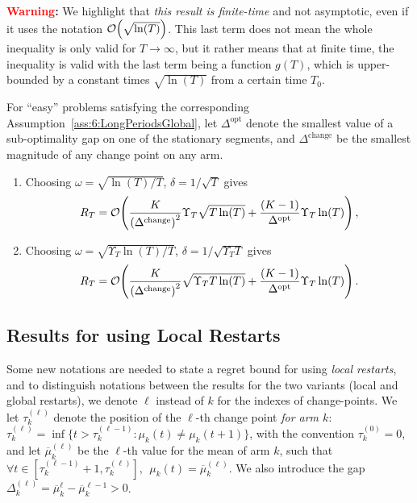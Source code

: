 \textbf{\textcolor{red}{Warning}:}
%
We highlight that \emph{this result is finite-time} and not asymptotic, even if it uses the notation $\mathop{}\mathopen{}\mathcal{O}\mathopen{}\left(\sqrt{\ln(T)}\right)$.
This last term does not mean the whole inequality is only valid for $T\to\infty$, but it rather means that at finite time, the inequality is valid with the last term being a function $g(T)$, which is upper-bounded by a constant times $\sqrt{\ln(T)}$ from a certain time $T_0$.

\begin{corollary}\label{cor:6:Global}
\begin{leftbar}[corollarybar]  %
    For ``easy'' problems satisfying the corresponding Assumption~\ref{ass:6:LongPeriodsGlobal},
    let $\Delta^{\text{opt}}$ denote the smallest value of a sub-optimality gap on one of the stationary segments, and $\Delta^{\text{change}}$ be the smallest magnitude of any change point on any arm.
    \begin{enumerate}
        \item Choosing $\omega = \sqrt{\ln(T)/T}$, $\delta = 1/\sqrt{T}$ gives
        \begin{equation}
            R_T = \mathop{}\mathopen{}\mathcal{O}\mathopen{}\left(\frac{K}{\left(\Delta^{\text{change}}\right)^2} \Upsilon_T\sqrt{T\ln(T)} + \frac{(K-1)}{\Delta^{\text{opt}}} \Upsilon_T\ln(T)\right),
        \end{equation}
        \item Choosing $\omega = \sqrt{\Upsilon_T\ln(T) / T}$, $\delta = 1 / \sqrt{\Upsilon_T T}$ gives
        \begin{equation}
            R_T = \mathop{}\mathopen{}\mathcal{O}\mathopen{}\left(\frac{K}{\left(\Delta^{\text{change}}\right)^2}\sqrt{\Upsilon_T T \ln(T)} + \frac{(K-1)}{\Delta^{\text{opt}}} \Upsilon_T\ln(T)\right).
        \end{equation}
    \end{enumerate}
\end{leftbar}  %
\end{corollary}


\subsection{Results for \GLRklUCB{} using Local Restarts}

Some new notations are needed to state a regret bound for \GLRklUCB{} using \emph{local restarts},
and to distinguish notations between the results for the two variants (local and global restarts), we denote $\ell$ instead of $k$ for the indexes of change-points.
We let $\tau_k^{(\ell)}$ denote the position of the $\ell$-th change point \emph{for arm $k$}: $\tau_k^{(\ell)} = \inf \{ t > \tau_k^{(\ell - 1)} : \mu_k(t) \neq \mu_k(t+1)\}$,
with the convention $\tau_k^{(0)}=0$, and let $\overline{\mu}_k^{(\ell)}$ be the $\ell$-th value for the mean of arm $k$, such that $\forall t \in [\tau_k^{(\ell-1)}+1, \tau_k^{(\ell)}], \ \ \mu_k(t) = \overline{\mu}_k^{(\ell)}$.
We also introduce the gap $\Delta_k^{(\ell)} = \overline{\mu}_k^{\ell} - \overline{\mu}_k^{\ell-1} > 0$.

